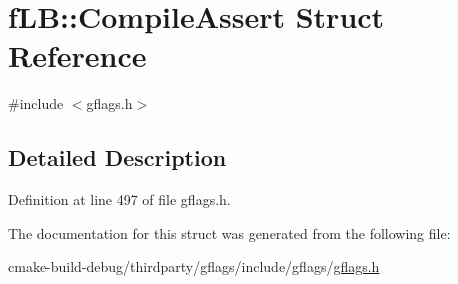 \hypertarget{structfLB_1_1CompileAssert}{}\section{f\+LB\+:\+:Compile\+Assert Struct Reference}
\label{structfLB_1_1CompileAssert}


{\ttfamily \#include $<$gflags.\+h$>$}



\subsection{Detailed Description}


Definition at line 497 of file gflags.\+h.



The documentation for this struct was generated from the following file\+:\begin{DoxyCompactItemize}
\item 
cmake-\/build-\/debug/thirdparty/gflags/include/gflags/\hyperlink{gflags_8h}{gflags.\+h}\end{DoxyCompactItemize}
